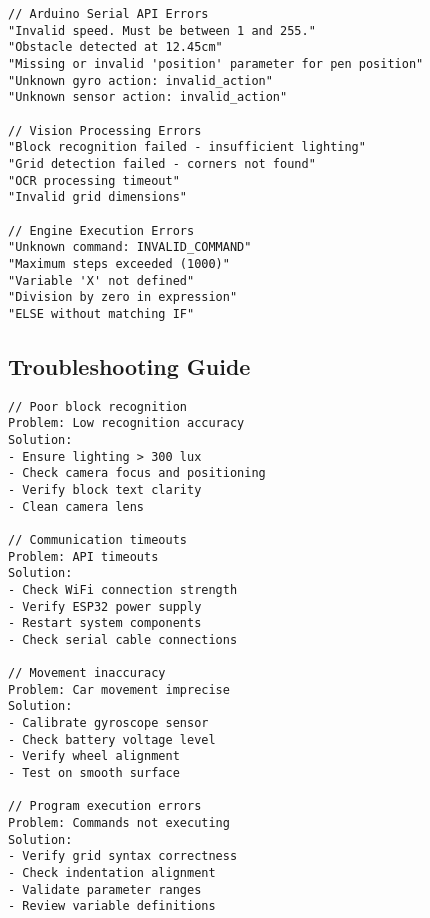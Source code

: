 \begin{lstlisting}[caption=Error Code Reference]
// Arduino Serial API Errors
"Invalid speed. Must be between 1 and 255."
"Obstacle detected at 12.45cm"
"Missing or invalid 'position' parameter for pen position"
"Unknown gyro action: invalid_action"
"Unknown sensor action: invalid_action"

// Vision Processing Errors
"Block recognition failed - insufficient lighting"
"Grid detection failed - corners not found"
"OCR processing timeout"
"Invalid grid dimensions"

// Engine Execution Errors
"Unknown command: INVALID_COMMAND"
"Maximum steps exceeded (1000)"
"Variable 'X' not defined"
"Division by zero in expression"
"ELSE without matching IF"
\end{lstlisting}

\subsection{Troubleshooting Guide}

\begin{lstlisting}[caption=Common Solutions]
// Poor block recognition
Problem: Low recognition accuracy
Solution: 
- Ensure lighting > 300 lux
- Check camera focus and positioning
- Verify block text clarity
- Clean camera lens

// Communication timeouts
Problem: API timeouts
Solution:
- Check WiFi connection strength
- Verify ESP32 power supply
- Restart system components
- Check serial cable connections

// Movement inaccuracy
Problem: Car movement imprecise
Solution:
- Calibrate gyroscope sensor
- Check battery voltage level
- Verify wheel alignment
- Test on smooth surface

// Program execution errors
Problem: Commands not executing
Solution:
- Verify grid syntax correctness
- Check indentation alignment
- Validate parameter ranges
- Review variable definitions
\end{lstlisting}